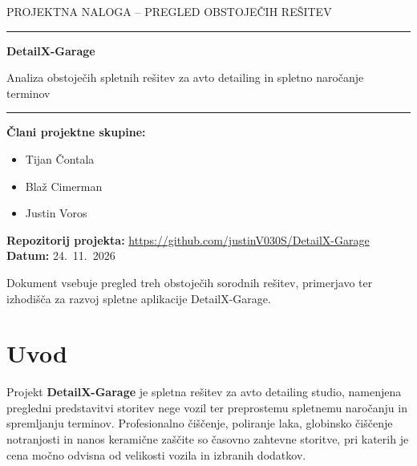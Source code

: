 \documentclass[11pt,a4paper]{article}
\begin{document}
\begin{titlepage}
  \centering
  \vspace*{3cm}
  {\color{sivo}\large PROJEKTNA NALOGA -- PREGLED OBSTOJEČIH REŠITEV\par}
  \vspace{0.8cm}
  \rule{\textwidth}{0.4pt}\par
  \vspace{1.2cm}
  {\color{naslovna}\Huge\bfseries DetailX-Garage\par}
  \vspace{0.6cm}
  {\Large Analiza obstoječih spletnih rešitev za avto detailing in spletno naročanje terminov\par}
  \vspace{1cm}
  \rule{\textwidth}{0.4pt}\par
  \vspace{3cm}

  \raggedright
  \textbf{Člani projektne skupine:}
  \begin{itemize}
    \item Tijan Čontala
    \item Blaž Cimerman
    \item Justin Voros
  \end{itemize}

  \vspace{1.2cm}
  \textbf{Repozitorij projekta:} \url{https://github.com/justinV030S/DetailX-Garage}\\[4pt]
  \textbf{Datum:} 24.~11.~2026

  \vfill
  \centering
  {\color{sivo}\small Dokument vsebuje pregled treh obstoječih sorodnih rešitev, primerjavo ter izhodišča za razvoj spletne aplikacije DetailX-Garage.\par}
\end{titlepage}

\section{Uvod}

Projekt \textbf{DetailX-Garage} je spletna rešitev za avto detailing studio, namenjena pregledni predstavitvi storitev nege vozil ter preprostemu spletnemu naročanju in spremljanju terminov. Profesionalno čiščenje, poliranje laka, globinsko čiščenje notranjosti in nanos keramične zaščite so časovno zahtevne storitve, pri katerih je cena močno odvisna od velikosti vozila in izbranih dodatkov.
\end{document}
